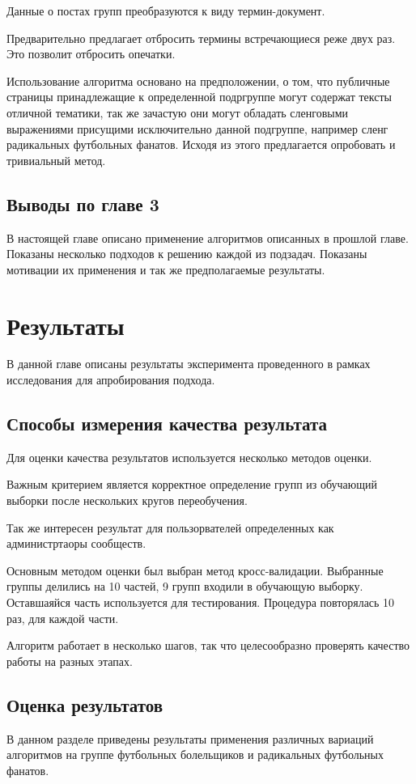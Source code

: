\documentclass[annotation,times,page4]{itmo-student-thesis}
\begin{document}
Данные о постах групп преобразуются к виду термин-документ.

Предварительно предлагает отбросить термины встречающиеся реже двух раз. Это позволит отбросить опечатки. 

Использование алгоритма основано на предположении, о том, что публичные страницы принадлежащие к определенной подргруппе могут содержат тексты отличной тематики, так же зачастую они могут обладать сленговыми выражениями присущими исключительно данной подгруппе, например сленг радикальных футбольных фанатов. Исходя из этого предлагается опробовать и тривиальный метод.
 
\section{Выводы по главе 3}
В настоящей главе описано применение алгоритмов описанных в прошлой главе. Показаны несколько подходов к решению каждой из подзадач. Показаны мотивации их применения и так же предполагаемые результаты. 
\chapter{Результаты}
В данной главе описаны результаты эксперимента проведенного в рамках исследования для апробирования подхода.
\section{Способы измерения качества результата}
Для оценки качества результатов используется несколько методов оценки.

Важным критерием является корректное определение групп из обучающий выборки после нескольких кругов переобучения. 

Так же интересен результат для пользорвателей определенных как администртаоры сообществ.

Основным методом оценки был выбран метод кросс-валидации. Выбранные группы делились на 10 частей, 9 групп входили в обучающую выборку. Оставшаяйся часть используется для тестирования. Процедура повторялась 10 раз, для каждой части.


Алгоритм работает в несколько шагов, так что целесообразно проверять качество работы на разных этапах.
\section{Оценка результатов}
В данном разделе приведены результаты применения различных вариаций алгоритмов на группе футбольных болельщиков и радикальных футбольных фанатов.
\end{document}
